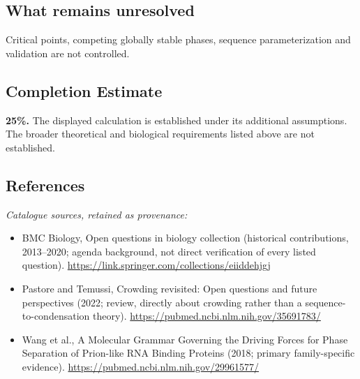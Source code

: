 \documentclass[11pt]{article}
\begin{document}
\subsection{What remains unresolved}
Critical points, competing globally stable phases, sequence parameterization and validation are not controlled.
\subsection{Completion Estimate}
\textbf{25\%.} The displayed calculation is established under its additional assumptions. The broader theoretical and biological requirements listed above are not established.
\subsection{References}
\noindent\emph{Catalogue sources, retained as provenance:}
\begin{itemize}
\item BMC Biology, Open questions in biology collection (historical contributions, 2013--2020; agenda background, not direct verification of every listed question). \url{https://link.springer.com/collections/eiiddehjgj}
\item Pastore and Temussi, Crowding revisited: Open questions and future perspectives (2022; review, directly about crowding rather than a sequence-to-condensation theory). \url{https://pubmed.ncbi.nlm.nih.gov/35691783/}
\item Wang et al., A Molecular Grammar Governing the Driving Forces for Phase Separation of Prion-like RNA Binding Proteins (2018; primary family-specific evidence). \url{https://pubmed.ncbi.nlm.nih.gov/29961577/}
\end{itemize}
\clearpage


\appendix
\end{document}
